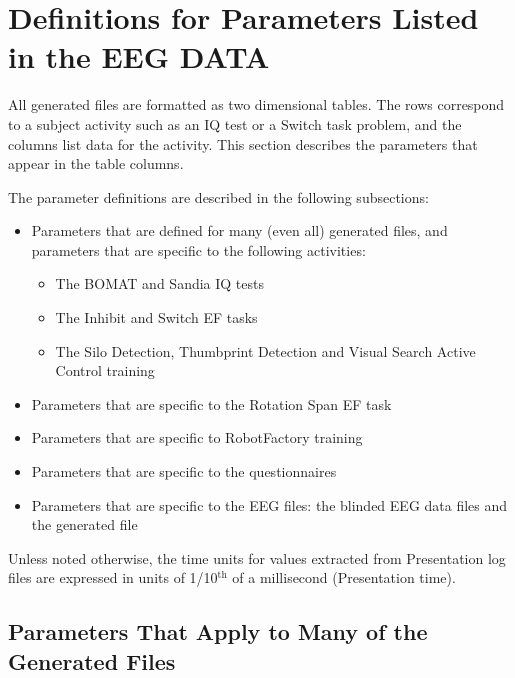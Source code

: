 \documentclass[letterpaper,10pt,english]{sphinxmanual}
\begin{document}
\chapter{Definitions for Parameters Listed in the EEG DATA}
\label{\detokenize{Data_Definations_Phase1B::doc}}\label{\detokenize{Data_Definations_Phase1B:definitions-for-parameters-listed-in-the-eeg-data}}
All generated files are formatted as two dimensional tables. The rows
correspond to a subject activity such as an IQ test or a Switch task
problem, and the columns list data for the activity. This section
describes the parameters that appear in the table columns.

The parameter definitions are described in the following subsections:
\begin{itemize}
\item {} 
Parameters that are defined for many (even all) generated files, and
parameters that are specific to the following activities:
\begin{itemize}
\item {} 
The BOMAT and Sandia IQ tests

\item {} 
The Inhibit and Switch EF tasks

\item {} 
The Silo Detection, Thumbprint Detection and Visual Search Active
Control training

\end{itemize}

\item {} 
Parameters that are specific to the Rotation Span EF task

\item {} 
Parameters that are specific to RobotFactory training

\item {} 
Parameters that are specific to the questionnaires

\item {} 
Parameters that are specific to the EEG files: the blinded EEG data
files and the generated  file

\end{itemize}

Unless noted otherwise, the time units for values extracted from
Presentation log files are expressed in units of 1/10$^{\text{th}}$ of a
millisecond (Presentation time).


\section{Parameters That Apply to Many of the Generated Files}
\label{\detokenize{Data_Definations_Phase1B:parameters-that-apply-to-many-of-the-generated-files}}
\end{document}
